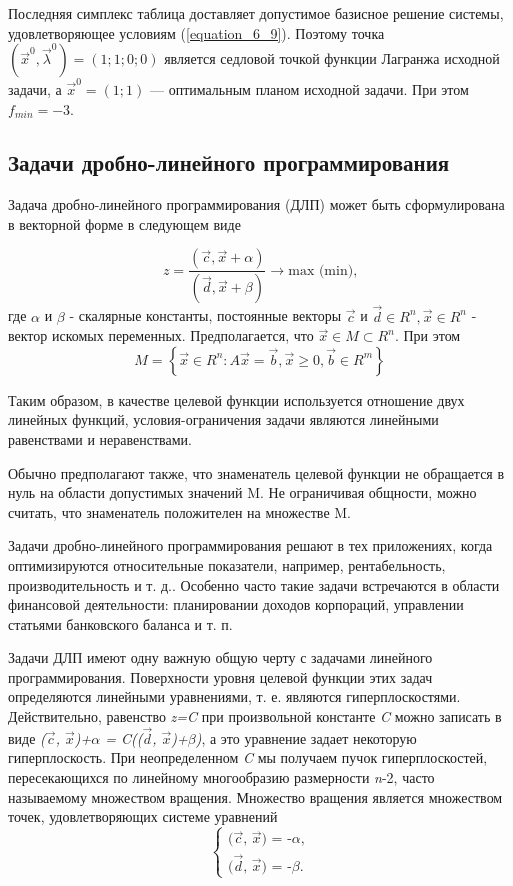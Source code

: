{Последняя симплекс таблица доставляет допустимое базисное решение системы, удовлетворяющее условиям (\ref{equation_6_9}). Поэтому точка
$(\vec x^0, \vec \lambda^0) = (1;1;0;0)$ является седловой точкой функции Лагранжа исходной задачи, а $\vec x^0 = (1;1)$ --- оптимальным планом исходной задачи. При этом $f_{min} = -3$.

\subsection{Задачи дробно-линейного программирования}

Задача дробно-линейного программирования (ДЛП) может быть сформулирована в векторной форме в следующем виде

\begin{equation*}
z = \frac{(\vec{c}, \vec{x}+\alpha)}{(\vec{d}, \vec{x}+\beta)}\rightarrow \textrm{max (min),}
\end{equation*}
где $\alpha$ и $\beta$ - скалярные константы, постоянные векторы $\vec{c}$ и $\vec{d} \in R^{n}, \vec{x} \in R^{n}$ - вектор искомых переменных. Предполагается, что $\vec{x}\in M \subset R^{n}$. При этом
\begin{equation*}
M=\left \{\vec{x} \in R^{n}: A\vec{x}=\vec{b}, \vec{x} \geqslant 0, \vec{b} \in R^{m} \right \}
\end{equation*}

Таким образом, в качестве целевой функции используется отношение двух линейных функций, условия-ограничения задачи являются линейными равенствами и неравенствами.

Обычно предполагают также, что знаменатель целевой функции не обращается в нуль на области допустимых значений M. Не ограничивая общности, можно считать, что знаменатель положителен на множестве M.

Задачи дробно-линейного программирования решают в тех приложениях, когда оптимизируются относительные показатели, например, рентабельность, производительность и т. д.. Особенно часто такие задачи встречаются в области финансовой деятельности: планировании доходов корпораций, управлении статьями банковского баланса и т. п.

Задачи ДЛП имеют одну важную общую черту с задачами линейного программирования. Поверхности уровня целевой функции этих задач определяются линейными уравнениями, т. е. являются гиперплоскостями. Действительно, равенство \textit{z=C} при произвольной  константе \textit{C} можно записать в виде \textit{($\vec{c}$, $\vec{x}$)+$\alpha$ = C(($\vec{d}$, $\vec{x}$)+$\beta$)}, а это уравнение задает некоторую гиперплоскость. При неопределенном \textit{C} мы получаем пучок гиперплоскостей, пересекающихся по линейному многообразию размерности \textit{n}-2, часто называемому множеством вращения. Множество вращения является множеством точек, удовлетворяющих системе уравнений
\begin{equation*}
\begin{cases}
\textit{($\vec{c}$, $\vec{x}$)   =   -$\alpha$,}
\\
\textit{($\vec{d}$, $\vec{x}$)   =   -$\beta$.}
\end{cases}
\end{equation*}

}

